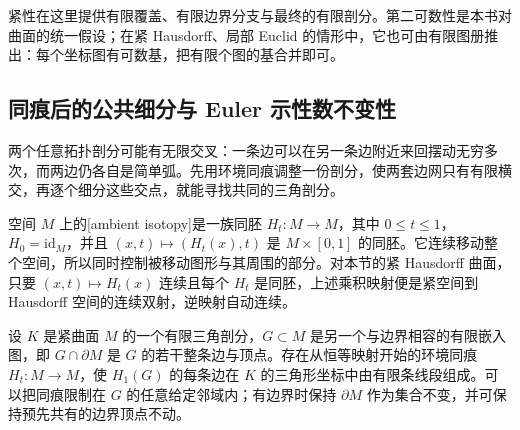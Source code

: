 紧性在这里提供有限覆盖、有限边界分支与最终的有限剖分。第二可数性是本书对曲面的统一假设；在紧 Hausdorff、局部 Euclid 的情形中，它也可由有限图册推出：每个坐标图有可数基，把有限个图的基合并即可。

\subsection{同痕后的公共细分与 Euler 示性数不变性}
\label{g1:subsec:0602:05}

两个任意拓扑剖分可能有无限交叉：一条边可以在另一条边附近来回摆动无穷多次，而两边仍各自是简单弧。先用环境同痕调整一份剖分，使两套边网只有有限横交，再逐个细分这些交点，就能寻找共同的三角剖分。

\begin{definition}\label{g1:def:ambient-isotopy}
	空间 \(M\) 上的[ambient isotopy]是一族同胚 \(H_t:M\to M\)，其中 \(0\le t\le1\)，\(H_0=\mathrm{id}_M\)，并且 \((x,t)\mapsto(H_t(x),t)\) 是 \(M\times[0,1]\) 的同胚。它连续移动整个空间，所以同时控制被移动图形与其周围的部分。对本节的紧 Hausdorff 曲面，只要 \((x,t)\mapsto H_t(x)\) 连续且每个 \(H_t\) 是同胚，上述乘积映射便是紧空间到 Hausdorff 空间的连续双射，逆映射自动连续。
\end{definition}

\begin{lemma}\label{g1:lem:graph-small-isotopy}
	设 \(K\) 是紧曲面 \(M\) 的一个有限三角剖分，\(G\subset M\) 是另一个与边界相容的有限嵌入图，即 \(G\cap\partial M\) 是 \(G\) 的若干整条边与顶点。存在从恒等映射开始的环境同痕 \(H_t:M\to M\)，使 \(H_1(G)\) 的每条边在 \(K\) 的三角形坐标中由有限条线段组成。可以把同痕限制在 \(G\) 的任意给定邻域内；有边界时保持 \(\partial M\) 作为集合不变，并可保持预先共有的边界顶点不动。
\end{lemma}

